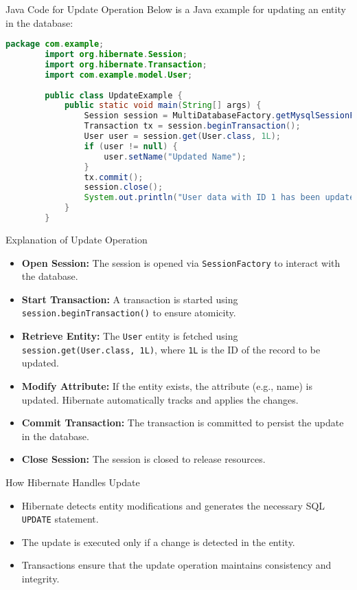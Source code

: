 \documentclass[aspectratio=169, table]{beamer}
\begin{document}
\begin{frame}[fragile]{Java Code for Update Operation}
	\vspace{20pt}
	Below is a Java example for updating an entity in the database:
	
	\begin{lstlisting}[language=Java, style=JavaStyle]
		package com.example;
		import org.hibernate.Session;
		import org.hibernate.Transaction;
		import com.example.model.User;
		
		public class UpdateExample {
			public static void main(String[] args) {
				Session session = MultiDatabaseFactory.getMysqlSessionFactory().openSession();
				Transaction tx = session.beginTransaction();
				User user = session.get(User.class, 1L);
				if (user != null) {
					user.setName("Updated Name");
				}
				tx.commit();
				session.close();
				System.out.println("User data with ID 1 has been updated.");
			}
		}
	\end{lstlisting}
\end{frame}

\begin{frame}{Explanation of Update Operation}
	\vspace{20pt}
	\begin{itemize}
		\item \textbf{Open Session:} The session is opened via \texttt{SessionFactory} to interact with the database.
		\item \textbf{Start Transaction:} A transaction is started using \texttt{session.beginTransaction()} to ensure atomicity.
		\item \textbf{Retrieve Entity:} The \texttt{User} entity is fetched using \texttt{session.get(User.class, 1L)}, where \texttt{1L} is the ID of the record to be updated.
		\item \textbf{Modify Attribute:} If the entity exists, the attribute (e.g., name) is updated. Hibernate automatically tracks and applies the changes.
		\item \textbf{Commit Transaction:} The transaction is committed to persist the update in the database.
		\item \textbf{Close Session:} The session is closed to release resources.
	\end{itemize}
\end{frame}

\begin{frame}{How Hibernate Handles Update}
	\vspace{20pt}
	\begin{itemize}
		\item Hibernate detects entity modifications and generates the necessary SQL \texttt{UPDATE} statement.
		\item The update is executed only if a change is detected in the entity.
		\item Transactions ensure that the update operation maintains consistency and integrity.
	\end{itemize}
\end{frame}
\end{document}
